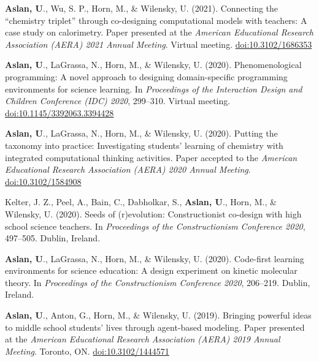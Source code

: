 \documentclass[11pt,letterpaper]{report} %
\begin{document}
    \begin{tablist}

        \item[2021] \tab{}\textbf{Aslan, U}., Wu, S. P., Horn, M., \& Wilensky, U. (2021). Connecting the \enquote{chemistry triplet} through co-designing computational models with teachers: A case study on calorimetry. Paper presented at the \textit{American Educational Research Association (AERA) 2021 Annual Meeting}. Virtual meeting. \href{https://doi.org/10.3102/1686353}{doi:10.3102/1686353}

        \item[2020] \tab{}\textbf{Aslan, U}., LaGrassa, N., Horn, M., \& Wilensky, U. (2020). Phenomenological programming: A novel approach to designing domain-specific programming environments for science learning. In \textit{Proceedings of the Interaction Design and Children Conference (IDC) 2020}, 299--310. Virtual meeting. \href{https://doi.org/10.1145/3392063.3394428}{doi:10.1145/3392063.3394428}

        \item[] \tab{}\textbf{Aslan, U}., LaGrassa, N., Horn, M., \& Wilensky, U. (2020). Putting the taxonomy into practice: Investigating students’ learning of chemistry with integrated computational thinking activities. Paper accepted to the \textit{American Educational Research Association (AERA) 2020 Annual Meeting}. \href{https://doi.org/10.3102/1584908}{doi:10.3102/1584908}

        \item[] \tab{}Kelter, J. Z., Peel, A., Bain, C., Dabholkar, S., \textbf{Aslan, U}., Horn, M., \& Wilensky, U. (2020). Seeds of (r)evolution: Constructionist co-design with high school science teachers. In \textit{Proceedings of the Constructionism Conference 2020}, 497--505. Dublin, Ireland.

        \item[] \tab{}\textbf{Aslan, U}., LaGrassa, N., Horn, M., \& Wilensky, U. (2020). Code-first learning environments for science education: A design experiment on kinetic molecular theory. In \textit{Proceedings of the Constructionism Conference 2020}, 206--219. Dublin, Ireland.

        \item[2019] \tab{}\textbf{Aslan, U}., Anton, G., Horn, M., \& Wilensky, U. (2019). Bringing powerful ideas to middle school students' lives through agent-based modeling. Paper presented at the \textit{American Educational Research Association (AERA) 2019 Annual Meeting}. Toronto, ON. \href{https://doi.org/10.3102/1444571}{doi:10.3102/1444571}


\end{tablist}
\end{document}
